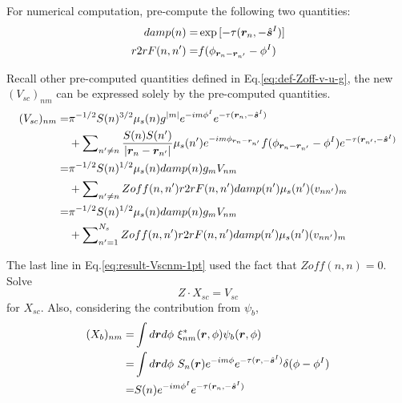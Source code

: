 \documentclass [10pt,letterpaper]{article}
\newcommand{\unitvectorsym}[1]{\hat{\vectorsym{#1}}}
\begin{document}
For numerical computation, pre-compute the following two quantities:
\begin{subequations} \label{eq:def-damp-r2rF} 
	\begin{align}
		damp(n)
		=&
		\exp
		{
			[-\tau(\vectorsym{r}_n,-\unitvectorsym{s}^I)]
		}
		\label{eq:def-tau}
		\\
		r2rF(n,n^\prime)
		=&
		f(\phi_{\vectorsym{r}_n-\vectorsym{r}_{n^\prime}} - \phi^I)
		\label{eq:def-r2rR}
	\end{align} 
\end{subequations}

Recall other pre-computed quantities defined in Eq.\eqref{eq:def-Zoff-v-u-g}, the new $(V_{sc})_{n m}$ can be expressed solely by the pre-computed quantities.
\begin{equation} \label{eq:result-Vscnm-1pt}
	\begin{split} 
		(V_{sc})_{n m}
		=&
		\pi^{-1/2}
		S(n)^{3/2}
		\mu_s(n)
		g^{\lvert m \rvert}
		e^{-i m \phi^I }
		e^{-\tau(\vectorsym{r}_n,-\unitvectorsym{s}^I)} 
		\\
		&+
		\sum \nolimits_{n^\prime \neq n}
		\frac
		{S(n)S(n^\prime)}
		{\lvert \vectorsym{r}_n - \vectorsym{r}_{n^\prime} \rvert} 
		\mu_s(n^\prime)
		e^{-i m \phi_{\vectorsym{r}_n - \vectorsym{r}_{n^\prime}}}
		f(\phi_{\vectorsym{r}_n - \vectorsym{r}_{n^\prime}}-\phi^I)
		e^{-\tau(\vectorsym{r}_{n^\prime},-\unitvectorsym{s}^I)} 
		\\
		=&
		\pi^{-1/2}
		S(n)^{1/2}
		\mu_s(n)
		damp(n)
		g_m
		V_{n m}
		\\
		&+
		\sum \nolimits_{n^\prime \neq n}
		Zoff(n,n^\prime)
		r2rF(n,n^\prime)
		damp(n^\prime)
		\mu_s(n^\prime)
		(v_{n n^\prime})_m
		\\
		=&
		\pi^{-1/2}
		S(n)^{1/2}
		\mu_s(n)
		damp(n)
		g_m
		V_{n m}
		\\
		&+
		\sum \nolimits_{n^\prime=1}^{N_s}
		Zoff(n,n^\prime)
		r2rF(n,n^\prime)
		damp(n^\prime)
		\mu_s(n^\prime)
		(v_{n n^\prime})_m
	\end{split}
\end{equation}

The last line in Eq.\eqref{eq:result-Vscnm-1pt} used the fact that $Zoff(n,n)=0$.
\\

Solve
\begin{equation} \label{eq:Z-Xsc-Vsc}
	Z\cdot X_{sc}=V_{sc}
\end{equation}
for $X_{sc}$.
Also, considering the contribution from $\psi_b$,
\begin{equation} \label{eq:result-Xbnm-1pt}
	\begin{split} 
		(X_b)_{n m}
		=&
		\int d\vectorsym{r} d\phi
		\ \xi^*_{n m}(\vectorsym{r},\phi)
		\psi_b(\vectorsym{r},\phi)
		\\
		=& 
		\int d\vectorsym{r} d\phi
		\ S_n(\vectorsym{r})
		e^{-i m \phi}
		e^{-\tau(\vectorsym{r},-\unitvectorsym{s}^I)}
		\delta(\phi-\phi^I) 
		\\
		=& 
		S(n)
		e^{-i m \phi^I}
		e^{-\tau(\vectorsym{r}_n,-\unitvectorsym{s}^I)}
	\end{split}
\end{equation}
\end{document}
